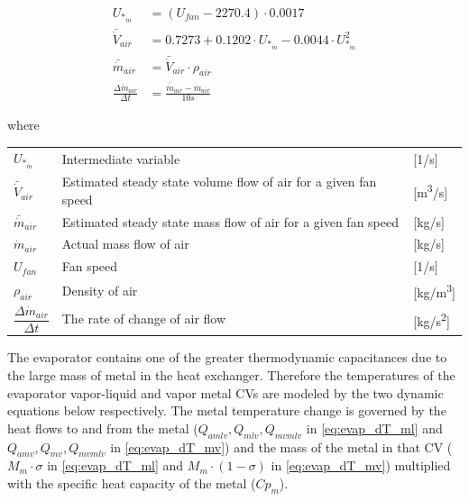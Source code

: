 \begin{align}
	U_{*_{\dot{m}}} & = (U_{fan} - 2270.4)\cdot 0.0017 \label{eq:evap_U_star_mdot}\\
	\bar{\dot{V}}_{air} & = 0.7273 + 0.1202 \cdot 	U_{*_{\dot{m}}}  -0.0044 \cdot 	U_{*_{\dot{m}}}^2	\label{eq:evap_Vbardot_air} \\
	\bar{\dot{m}}_{air} & = \bar{\dot{V}}_{air} \cdot \rho_{air}	\label{eq:Evaporator_FanAirInstantMassFlow} \\
	\frac{\Delta \dot{m}_{air}}{\Delta t} & = \frac{\bar{\dot{m}}_{air}  - \dot{m}_{air}} {10s}	\label{eq:Evaporator_FanAirRateOfChange}
\end{align}

where

\begin{center}
	\begin{tabular}{l p{8cm} l}
		$ 	U_{*_{\dot{m}}} $ 						& Intermediate variable												& [1/\si{s}]\\
		$\bar{\dot{V}}_{air}$						& Estimated steady state volume flow of air for a given fan speed 	& [\si{m^3}/\si{s}] \\
		$\bar{\dot{m}}_{air}$						& Estimated steady state mass flow of air for a given fan speed 	& [\si{kg}/\si{s}] \\
		$\dot{m}_{air}$								& Actual mass flow of air					  						& [\si{kg}/\si{s}] \\
		$U_{fan}$									& Fan speed 														& [1/\si{s}] \\
		$\rho_{air}$								& Density of air													& [\si{kg}/\si{m^3}] \\[0.2cm]
		$\dfrac{\Delta \dot{m}_{air}}{\Delta t} $ 	& The rate of change of	air flow 									& [\si{kg}/\si{s^2}]
	\end{tabular}
\end{center}

The evaporator contains one of the greater thermodynamic capacitances due to the large mass of metal in the heat exchanger. Therefore the temperatures of the evaporator vapor-liquid and vapor metal CVs are modeled by the two dynamic equations below respectively. The metal temperature change is governed by the heat flows to and from the metal ($ Q_{amlv}, Q_{mlv}, Q_{mvmlv} $ in \cref{eq:evap_dT_ml} and $ Q_{amv}, Q_{mv}, Q_{mvmlv} $ in \cref{eq:evap_dT_mv}) and the mass of the metal in that CV ($M_m \cdot \sigma$ in \cref{eq:evap_dT_ml} and $M_m \cdot (1 - \sigma)$ in \cref{eq:evap_dT_mv}) multiplied with the specific heat capacity of the metal ($Cp_m$).

